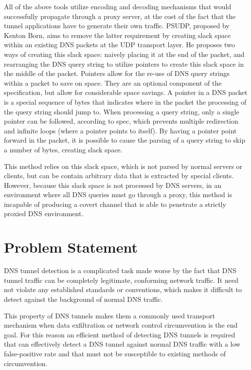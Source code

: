 \documentclass{article}
\theoremstyle{remark}
\theoremstyle{definition}
\theoremstyle{definition}
\theoremstyle{definition}
\begin{document}
All of the above tools utilize encoding and decoding mechanisms that would
successfully propagate through a proxy server, at the cost of the fact
that the tunnel applications have to generate their own traffic. PSUDP, proposed
by Kenton Born, aims to remove the latter requirement by creating slack space
within an existing DNS packets at the UDP transport layer. He proposes two ways
of creating this slack space: naively placing it at the end of the packet, and
rearranging the DNS query string to utilize pointers to create this
slack space in the middle of the packet. Pointers allow
for the re-use of DNS query strings within a packet to save on space. They are
an optional component of the specification, but allow for considerable space
savings. A pointer in a DNS packet is a special sequence of bytes that
indicates where in the packet the processing of the query string should jump
to. When processing a query string, only a single pointer can be followed,
according to spec, which prevents multiple redirection and infinite loops
(where a pointer points to itself). By having a pointer point forward in the
packet, it is possible to cause the parsing of a query string to skip a number
of bytes, creating slack space.

This method relies on this slack space, which is not parsed by normal servers
or clients, but can be contain arbitrary data that is extracted by special
clients. However, because this slack space is not processed by DNS servers, in
an environment where all DNS queries must go through a proxy, this method is
incapable of producing a covert channel that is able to penetrate a strictly
proxied DNS environment.

\section{Problem Statement}

DNS tunnel detection is a complicated task made worse by the fact that DNS
tunnel traffic can be completely legitimate, conforming network traffic. It
need not violate any established standards or conventions, which makes it
difficult to detect against the background of normal DNS traffic.

This property of DNS tunnels makes them a commonly used transport mechanism
when data exfiltration or network control circumvention is the end goal. For
this reason an efficient method of detecting DNS tunnels is required that can
effectively detect a DNS tunnel against normal DNS traffic with a low
false-positive rate and that must not be susceptible to existing methods of
circumvention.
\end{document}

